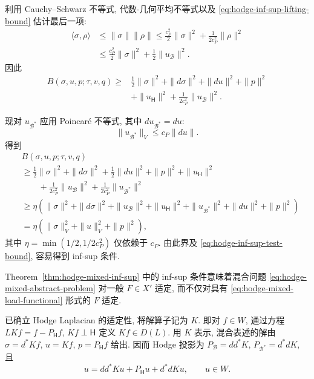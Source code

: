 \begin{Proof}
{利用 Cauchy–Schwarz 不等式, 代数-几何平均不等式以及 \eqref{eq:hodge-inf-sup-lifting-bound} 估计最后一项:}
\[
\begin{aligned}
\langle\sigma,\rho\rangle&\leq\|\sigma\|\|\rho\|\leq\frac{c_P^2}{2}\|\sigma\|^2+\frac{1}{2c_P^2}\|\rho\|^2\\
&\leq\frac{c_P^2}{2}\|\sigma\|^2+\frac12\|u_{\mathcal B}\|^2.
\end{aligned}
\]
{因此}
\[
\begin{aligned}
B(\sigma,u,p;\tau,v,q)\geq{}&\frac12\|\sigma\|^2+\|d\sigma\|^2+\|du\|^2+\|p\|^2\\
&+\|u_{\mathsf H}\|^2+\frac{1}{2c_P^2}\|u_{\mathcal B}\|^2.
\end{aligned}
\]

{现对 $u_{\mathcal B^*}$ 应用 Poincaré 不等式, 其中 $du_{\mathcal B^*}=du$:}
\[
\|u_{\mathcal B^*}\|_V\leq c_P\|du\|.
\]
{得到}
\[
\begin{aligned}
&B(\sigma,u,p;\tau,v,q)\\
&\geq\frac12\|\sigma\|^2+\|d\sigma\|^2+\frac12\|du\|^2+\|p\|^2+\|u_{\mathsf H}\|^2\\
&\qquad+\frac{1}{2c_P^2}\|u_{\mathcal B}\|^2+\frac{1}{2c_P^2}\|u_{\mathcal B^*}\|^2\\
&\geq\eta(\|\sigma\|^2+\|d\sigma\|^2+\|u_{\mathcal B}\|^2+\|u_{\mathsf H}\|^2+\|u_{\mathcal B^*}\|^2+\|du\|^2+\|p\|^2)\\
&=\eta(\|\sigma\|_V^2+\|u\|_V^2+\|p\|^2),
\end{aligned}
\]
{其中 $\eta=\min(1/2,1/2c_P^2)$ 仅依赖于 $c_P$. 由此界及 \eqref{eq:hodge-inf-sup-test-bound}, 容易得到 inf-sup 条件.}
\end{Proof}


\begin{Remark}\label{rem:hodge-general-mixed-load}
{Theorem~\ref{thm:hodge-mixed-inf-sup} 中的 inf-sup 条件意味着混合问题 \eqref{eq:hodge-mixed-abstract-problem} 对一般 $F\in X'$ 适定, 而不仅对具有 \eqref{eq:hodge-mixed-load-functional} 形式的 $F$ 适定.}
\end{Remark}

{已确立 Hodge Laplacian 的适定性, 将解算子记为 $K$. 即对 $f\in W$, 通过方程 $LKf=f-P_{\mathsf H}f$, $Kf\perp\mathsf H$ 定义 $Kf\in D(L)$. 用 $K$ 表示, 混合表述的解由 $\sigma=d^*Kf$, $u=Kf$, $p=P_{\mathsf H}f$ 给出. 因而 Hodge 投影为 $P_{\mathcal B}=dd^*K$, $P_{\mathcal B^*}=d^*dK$, 且}
\[
u=dd^*Ku+P_{\mathsf H}u+d^*dKu,\qquad u\in W.
\]

